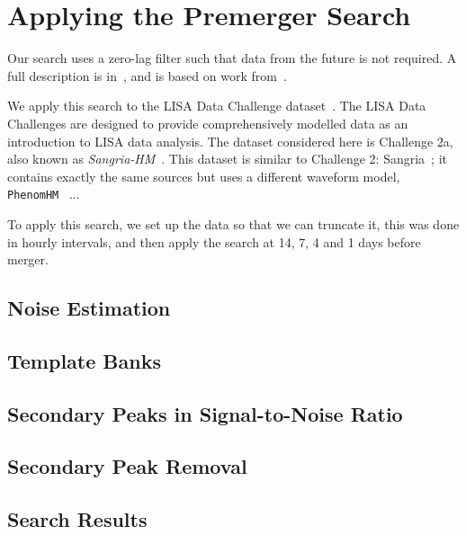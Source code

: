 \section{Applying the Premerger Search}
\label{sec:zerolag_sangria}

Our search uses a zero-lag filter such that data from the future is not required. A full
description is in~\cite{CabournDavies:2024hea}, and is based on work from~\cite{Tsukada:2017cuf}.

We apply this search to the LISA Data Challenge dataset~\cite{Baghi:2022ucj, LDC_WEBSITE}.
The LISA Data Challenges are designed to provide comprehensively modelled data as an introduction
to LISA data analysis. The dataset considered here is Challenge 2a, also known as
\textit{Sangria-HM}~\cite{LDC_WEBSITE_SANGRIA_HM}.
This dataset is similar to Challenge 2: Sangria~\cite{LDC_WEBSITE_SANGRIA, le_jeune_2022_7132178};
it contains exactly the same sources but uses a different waveform model, \texttt{PhenomHM}~\cite{}
... 

To apply this search, we set up the data so that we can truncate it, this was done in hourly intervals,
and then apply the search at 14, 7, 4 and 1 days before merger.

\subsection{Noise Estimation}
\label{subsec:psds}

\subsection{Template Banks}
\label{subsec:zerolag_banks}

\subsection{Secondary Peaks in Signal-to-Noise Ratio}
\label{subsec:double_peaks}

\subsection{Secondary Peak Removal}
\label{subsec:peak_removal}

\subsection{Search Results}
\label{subsec:zerolag_results}
